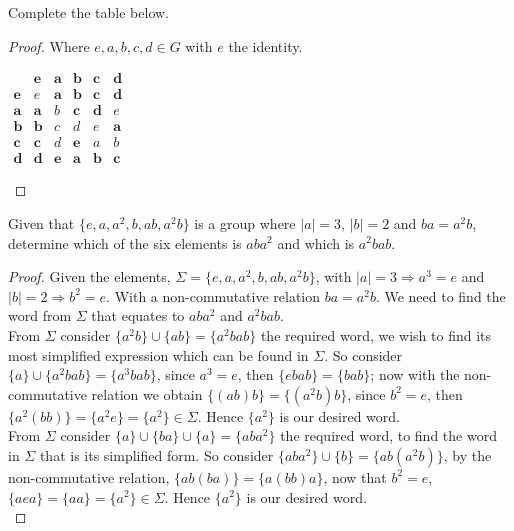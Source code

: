 \begin{assignment}[
  header=HeaderA,
  body=BodyA,
  title={Homework 1},
  duedate={3-February-2026},
  toc=false,
  toctitle={This appears on the Table of contents.},
  exlist=false
]
\begin{exer}[Problem 2.49]
Complete the table below.
\begin{proof}
Where $e,a,b,c,d\in G$ with $e$ the identity.
\begin{center}
\renewcommand{\arraystretch}{1.2}
$\begin{array}{c|ccccc}
    & \boldsymbol{e} & \boldsymbol{a} & \boldsymbol{b} & \boldsymbol{c} & \boldsymbol{d} \\ \hline
    \boldsymbol{e} & e & \textbf{a} & \textbf{b} & \textbf{c} & \textbf{d} \\
    \boldsymbol{a} & \textbf{a} & b & \textbf{c} & \textbf{d} & e \\
    \boldsymbol{b} & \textbf{b} & c & d & e & \textbf{a} \\
    \boldsymbol{c} & \textbf{c} & d & \textbf{e} & a & b \\
    \boldsymbol{d} & \textbf{d} & \textbf{e} & \textbf{a} & \textbf{b} & \textbf{c}
\end{array}$
\end{center}    
\end{proof}
\end{exer}

\begin{exer}[Problem 3.10]
Given that $\{e,a,a^2,b,ab,a^2b\}$ is a group where $\mid a \mid =3$, $\mid b \mid = 2$ and $ba = a^2b$, determine which of the six elements is $aba^2$ and which is $a^2bab$.    
\begin{proof}
Given the elements, $\Sigma = \{e,a,a^2,b,ab,a^2b\}$, with $\mid a \mid = 3 \Rightarrow a^3 = e$ and $\mid b \mid = 2 \Rightarrow b^2 = e$. With a non-commutative relation $ba=a^2b$. We need to find the word from $\Sigma$ that equates to $aba^2$ and $a^2bab$.\\

From $\Sigma$ consider $\{a^2b\} \cup \{ab\} = \{a^2bab\}$ the required word, we wish to find its most simplified expression which can be found in $\Sigma$. So consider $\{a\} \cup \{a^2bab\} = \{a^3bab\}$, since $a^3 =e$, then $\{ebab\} = \{bab\}$; now with the non-commutative relation we obtain $\{(ab)b\} = \{(a^2b)b\}$, since $b^2 =e$, then $\{a^2(bb)\} =\{a^2e\} = \{a^2\} \in \Sigma$. Hence $\{a^2\}$ is our desired word.\\

From $\Sigma$ consider $\{a\} \cup \{ba\} \cup \{a\} = \{aba^2\}$ the required word, to find the word in $\Sigma$ that is its simplified form. So consider $\{aba^2\} \cup \{b\} = \{ab(a^2b)\}$, by the non-commutative relation, $\{ab(ba)\} = \{a(bb)a\}$, now that $b^2 =e$, $\{aea\} = \{aa\} = \{a^2\} \in \Sigma$. Hence $\{a^2\}$ is our desired word.\\


\end{proof}
\end{exer}
\end{assignment}
